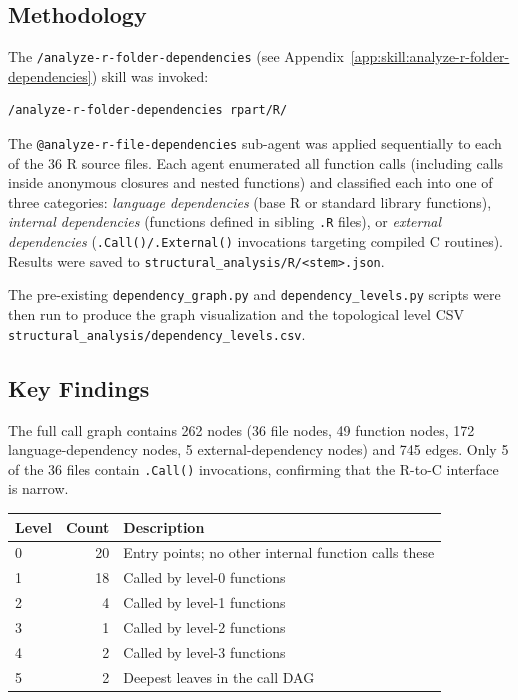 \documentclass[12pt]{article}
\newcommand{\skillapp}[2]{\texttt{/#1} (see Appendix~\ref{app:skill:#2})}
\begin{document}
\subsection{Methodology}

The \skillapp{analyze-r-folder-dependencies}{analyze-r-folder-dependencies} skill was invoked:
\begin{lstlisting}[style=skill]
/analyze-r-folder-dependencies rpart/R/
\end{lstlisting}

The \texttt{@analyze-r-file-dependencies} sub-agent was applied sequentially to each of the 36 R source files. Each agent enumerated all function calls (including calls inside anonymous closures and nested functions) and classified each into one of three categories: \emph{language dependencies} (base R or standard library functions), \emph{internal dependencies} (functions defined in sibling \texttt{.R} files), or \emph{external dependencies} (\texttt{.Call()/.External()} invocations targeting compiled C routines). Results were saved to \texttt{structural\_analysis/R/<stem>.json}.

The pre-existing \texttt{dependency\_graph.py} and \texttt{dependency\_levels.py} scripts were then run to produce the graph visualization and the topological level CSV \texttt{structural\_analysis/dependency\_levels.csv}.

\subsection{Key Findings}

The full call graph contains 262 nodes (36 file nodes, 49 function nodes, 172 language-dependency nodes, 5 external-dependency nodes) and 745 edges. Only 5 of the 36 files contain \texttt{.Call()} invocations, confirming that the R-to-C interface is narrow.

\medskip
\begin{center}
\begin{tabular}{lrl}
\toprule
Level & Count & Description \\
\midrule
0 & 20 & Entry points; no other internal function calls these \\
1 & 18 & Called by level-0 functions \\
2 & 4 & Called by level-1 functions \\
3 & 1 & Called by level-2 functions \\
4 & 2 & Called by level-3 functions \\
5 & 2 & Deepest leaves in the call DAG \\
\bottomrule
\end{tabular}
\end{center}
\medskip
\end{document}
